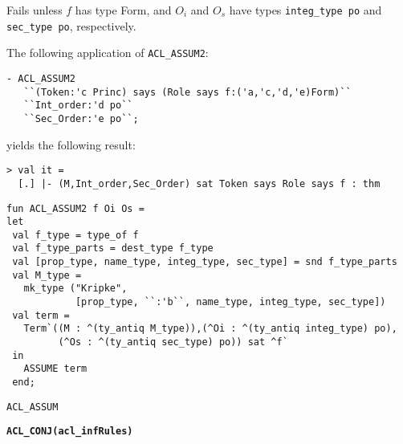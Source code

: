 \FAILURE Fails unless $f$ has type Form, and $O_i$ and $O_s$ have
types \texttt{integ\_type po} and \texttt{sec\_type po}, respectively.

\EXAMPLE
The following application of \texttt{ACL\_ASSUM2}:
\begin{holboxed}
\begin{verbatim}
- ACL_ASSUM2 
   ``(Token:'c Princ) says (Role says f:('a,'c,'d,'e)Form)`` 
   ``Int_order:'d po`` 
   ``Sec_Order:'e po``;
\end{verbatim}
\end{holboxed}
yields the following result:
\begin{holboxed}
\begin{verbatim}
> val it =  
  [.] |- (M,Int_order,Sec_Order) sat Token says Role says f : thm
\end{verbatim}
\end{holboxed}

\IMPLEMENTATION
\begin{holboxed}
\begin{verbatim}
fun ACL_ASSUM2 f Oi Os = 
let
 val f_type = type_of f
 val f_type_parts = dest_type f_type
 val [prop_type, name_type, integ_type, sec_type] = snd f_type_parts
 val M_type = 
   mk_type ("Kripke",
            [prop_type, ``:'b``, name_type, integ_type, sec_type])
 val term = 
   Term`((M : ^(ty_antiq M_type)),(^Oi : ^(ty_antiq integ_type) po),
         (^Os : ^(ty_antiq sec_type) po)) sat ^f`
 in
   ASSUME term
 end;
\end{verbatim}
\end{holboxed}

\SEEALSO
\texttt{ACL\_ASSUM}
\ENDDOC

\begin{holboxed}
  \begin{Large}
    \textbf{\texttt{ACL\_CONJ}}\hfill{}\textbf{\texttt{(acl\_infRules)}}
  \end{Large}
\end{holboxed}

